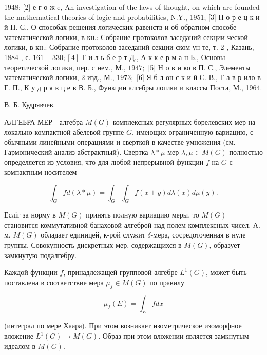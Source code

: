 \documentclass[10pt]{article}
\begin{document}
1948; [2] е г о ж e, An investigation of the laws of thought, on which are founded the mathematical theories of logic and probabilities, N.Y., 1951; [3] П о р е ц к и й П. С., О способах решения логических равенств и об обратном способе математической логики, в кн.: Собрание протоколов заседаний секции ческой логики, в кн.: Собрание протоколов заседаний секции ском ун-те, т. 2 , Казань, 1884 , с. $161-330 ;[4]$ Г и л ь б е р т Д., А к к е р м а н Б., Основы теоретической логики, пер. с нем., М., $1947 ;$ [5] Н о в и ко в П. С., Элементы математической логики, 2 изд., М., $1973 ;$ [6] Я б л он с к и й С. В., Г а в р ило в $Г$. П., К у д р я в ц е в В. Б., Функции алгебры логики и классы Поста, М., 1964.



В. Б. Кудрявчев.



АЛГЕБРА МЕР - алгебра $M(G)$ комплексных регулярных борелевских мер на локально компактной абелевой группе $G$, имеющих ограниченную вариацию, с обычными линейными операциями и сверткой в качестве умножения (см. Гармонический анализ абстрактный). Свертка $\lambda * \mu$ мер $\lambda, \mu \in M(G)$ полностью определяется из условия, что для любой непрерывной функции $f$ на $G$ с компактным носителем



\[

\int_{G} f d(\lambda * \mu)=\int_{G} \int_{G} f(x+y) d \lambda(x) d \mu(y) .

\]



Есліг за норму в $M(G)$ принять полную вариацию меры, то $M(G)$ становится коммутативной банаховой алгеброй над полем комплексных чисел. А. м. $M(G)$ обладает единицей, к-рой служит $\delta$-мера, сосредоточенная в нуле группы. Совокупность дискретных мер, содержащихся в $M(G)$, образует замкнутую подалгебру.



Каждой функции $f$, принадлежащей групповой алгебре $L^{1}(G)$, может быть поставлена в соответствие мера $\mu_{f} \in M(G)$ по правилу



\[

\mu_{f}(E)=\int_{E} f d x

\]



(интеграл по мере Хаара). При этом возникает изометрическое изоморфное вложение $L^{1}(G) \rightarrow M(G)$. Образ при этом вложении является замкнутым идеалом в $M(G)$.
\end{document}
